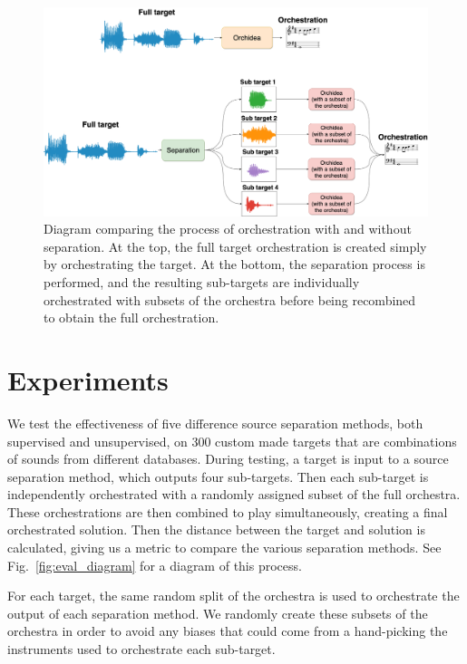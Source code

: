 \documentclass{article}
\begin{document}
  \begin{figure}[t]
    \centering
      \includegraphics[width=\columnwidth]{figures/diagram.png}
      \caption{Diagram comparing the process of orchestration with and without separation. At the top, the full target orchestration is created simply by orchestrating the target. At the bottom, the separation process is performed, and the resulting sub-targets are individually orchestrated with subsets of the orchestra before being recombined to obtain the full orchestration.}\label{fig:full_diagram}
  \end{figure}

\section{Experiments}\label{sec:experiments}
  
  We test the effectiveness of five difference source separation methods, both supervised and unsupervised, on 300 custom made targets that are combinations of sounds from different databases. During testing, a target is input to a source separation method, which outputs four sub-targets. Then each sub-target is independently orchestrated with a randomly assigned subset of the full orchestra. These orchestrations are then combined to play simultaneously, creating a final orchestrated solution. Then the distance between the target and solution is calculated, giving us a metric to compare the various separation methods. See Fig.~\ref{fig:eval_diagram} for a diagram of this process. 
  
  For each target, the same random split of the orchestra is used to orchestrate the output of each separation method. We randomly create these subsets of the orchestra in order to avoid any biases that could come from a hand-picking the instruments used to orchestrate each sub-target.  
  
\end{document}
